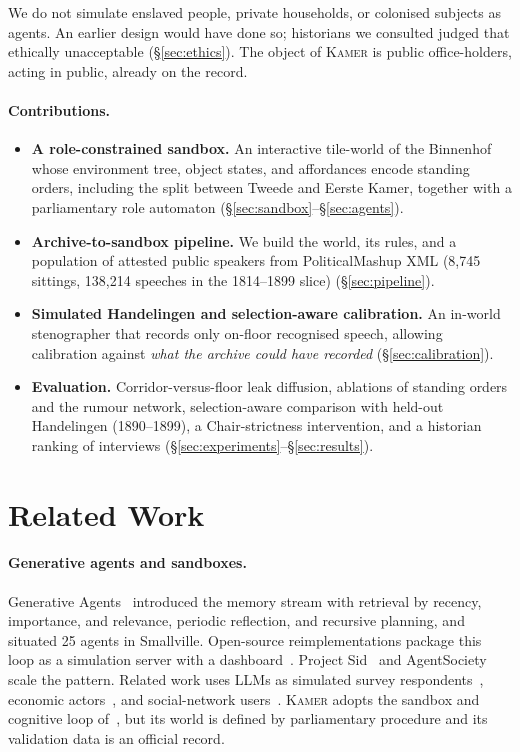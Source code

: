 \documentclass[sigconf,review,anonymous]{acmart}
\newcommand{\sys}{\textsc{Kamer}}
\begin{document}
We do not simulate enslaved people, private households, or colonised
subjects as agents. An earlier design would have done so; historians we
consulted judged that ethically unacceptable (\S\ref{sec:ethics}). The
object of \sys{} is public office-holders, acting in public, already on
the record.

\paragraph{Contributions.}
\begin{itemize}[leftmargin=*,nosep]
  \item \textbf{A role-constrained sandbox.} An interactive tile-world of
  the Binnenhof whose environment tree, object states, and affordances encode
  standing orders, including the split between Tweede and Eerste Kamer,
  together with a parliamentary role automaton
  (\S\ref{sec:sandbox}--\S\ref{sec:agents}).
  \item \textbf{Archive-to-sandbox pipeline.} We build the world, its rules,
  and a population of attested public speakers from PoliticalMashup XML
  (8{,}745 sittings, 138{,}214 speeches in the 1814--1899 slice)
  (\S\ref{sec:pipeline}).
  \item \textbf{Simulated Handelingen and selection-aware calibration.} An
  in-world stenographer that records only on-floor recognised speech,
  allowing calibration against \emph{what the archive could have recorded}
  (\S\ref{sec:calibration}).
  \item \textbf{Evaluation.} Corridor-versus-floor leak diffusion, ablations
  of standing orders and the rumour network, selection-aware comparison
  with held-out Handelingen (1890--1899), a Chair-strictness
  intervention, and a historian ranking of interviews
  (\S\ref{sec:experiments}--\S\ref{sec:results}).
\end{itemize}

\section{Related Work}
\label{sec:related}

\paragraph{Generative agents and sandboxes.} Generative
Agents~\cite{park2023generative} introduced the memory stream with
retrieval by recency, importance, and relevance, periodic reflection, and
recursive planning, and situated 25 agents in Smallville. Open-source
reimplementations package this loop as a simulation server with a
dashboard~\cite{smallvillerepo}. Project Sid~\cite{al2024projectsid} and
AgentSociety~\cite{piao2025agentsociety} scale the pattern. Related work
uses LLMs as simulated survey respondents~\cite{argyle2023outofone,aher2023turing},
economic actors~\cite{horton2023homosilicus}, and social-network
users~\cite{gao2023s3,tornberg2023simulating}. \sys{} adopts the sandbox
and cognitive loop of~\cite{park2023generative}, but its world is defined
by parliamentary procedure and its validation data is an official record.
\end{document}
